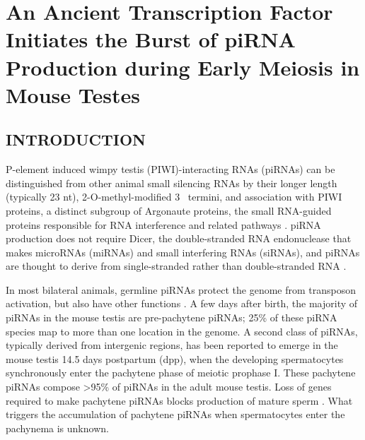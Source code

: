 \chapter{An Ancient Transcription Factor Initiates the Burst of piRNA Production during Early Meiosis in Mouse Testes} \label{MolCel} 

\section{INTRODUCTION}\label{c3-intro}

  P-element induced wimpy testis (PIWI)-interacting RNAs (piRNAs) can be distinguished from other animal small silencing RNAs by their longer length (typically 23 nt), 2\textprime-O-methyl-modified 3\textprime~ termini, and association with PIWI proteins, a distinct subgroup of Argonaute proteins, the small RNA-guided proteins responsible for RNA interference and related pathways \citep{Kumar1998,Hannon2008,Farazi2008, Kim2009,Thomson2009,Cenik2011}. piRNA production does not require Dicer, the double-stranded RNA endonuclease that makes microRNAs (miRNAs) and small interfering RNAs (siRNAs), and piRNAs are thought to derive from single-stranded rather than double-stranded RNA \citep{Vagin2006, Houwing2007}.

  In most bilateral animals, germline piRNAs protect the genome from transposon activation, but also have other functions \citep{Aravin2001, Aravin2007a, Aravin2008a, Vagin2004, Brennecke2007, Carmell2007, Hartig2007, Kuramochi-Miyagawa2008, Ashe2012, Lee2012, Shirayama2012}. A few days after birth, the majority of piRNAs in the mouse testis are pre-pachytene piRNAs; 25\% of these piRNA species map to more than one location in the genome. A second class of piRNAs, typically derived from intergenic regions, has been reported to emerge in the mouse testis 14.5 days postpartum (dpp), when the developing spermatocytes synchronously enter the pachytene phase of meiotic prophase I. These pachytene piRNAs compose >95\% of piRNAs in the adult mouse testis. Loss of genes required to make pachytene piRNAs blocks production of mature sperm \citep{Deng2002c, Aravin2001, Reuter2011, Vourekas2012}. What triggers the accumulation of pachytene piRNAs when spermatocytes enter the pachynema is unknown.

